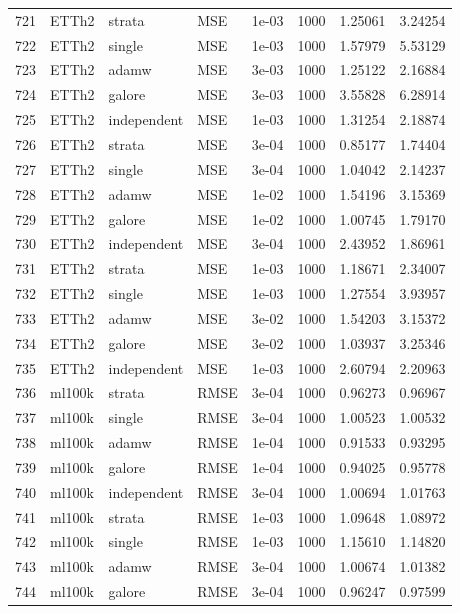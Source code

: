 \begin{longtable}{rlllrrrr}
\rowcolor{oursbg}
721 & ETTh2 & strata & MSE & 1e-03 & 1000 & 1.25061 & 3.24254 \\
722 & ETTh2 & single & MSE & 1e-03 & 1000 & 1.57979 & 5.53129 \\
723 & ETTh2 & adamw & MSE & 3e-03 & 1000 & 1.25122 & 2.16884 \\
724 & ETTh2 & galore & MSE & 3e-03 & 1000 & 3.55828 & 6.28914 \\
725 & ETTh2 & independent & MSE & 1e-03 & 1000 & 1.31254 & 2.18874 \\
\rowcolor{oursbg}
726 & ETTh2 & strata & MSE & 3e-04 & 1000 & 0.85177 & 1.74404 \\
727 & ETTh2 & single & MSE & 3e-04 & 1000 & 1.04042 & 2.14237 \\
728 & ETTh2 & adamw & MSE & 1e-02 & 1000 & 1.54196 & 3.15369 \\
729 & ETTh2 & galore & MSE & 1e-02 & 1000 & 1.00745 & 1.79170 \\
730 & ETTh2 & independent & MSE & 3e-04 & 1000 & 2.43952 & 1.86961 \\
\rowcolor{oursbg}
731 & ETTh2 & strata & MSE & 1e-03 & 1000 & 1.18671 & 2.34007 \\
732 & ETTh2 & single & MSE & 1e-03 & 1000 & 1.27554 & 3.93957 \\
733 & ETTh2 & adamw & MSE & 3e-02 & 1000 & 1.54203 & 3.15372 \\
734 & ETTh2 & galore & MSE & 3e-02 & 1000 & 1.03937 & 3.25346 \\
735 & ETTh2 & independent & MSE & 1e-03 & 1000 & 2.60794 & 2.20963 \\
\rowcolor{oursbg}
736 & ml100k & strata & RMSE & 3e-04 & 1000 & 0.96273 & 0.96967 \\
737 & ml100k & single & RMSE & 3e-04 & 1000 & 1.00523 & 1.00532 \\
738 & ml100k & adamw & RMSE & 1e-04 & 1000 & 0.91533 & 0.93295 \\
739 & ml100k & galore & RMSE & 1e-04 & 1000 & 0.94025 & 0.95778 \\
740 & ml100k & independent & RMSE & 3e-04 & 1000 & 1.00694 & 1.01763 \\
\rowcolor{oursbg}
741 & ml100k & strata & RMSE & 1e-03 & 1000 & 1.09648 & 1.08972 \\
742 & ml100k & single & RMSE & 1e-03 & 1000 & 1.15610 & 1.14820 \\
743 & ml100k & adamw & RMSE & 3e-04 & 1000 & 1.00674 & 1.01382 \\
744 & ml100k & galore & RMSE & 3e-04 & 1000 & 0.96247 & 0.97599 \\

\end{longtable}
